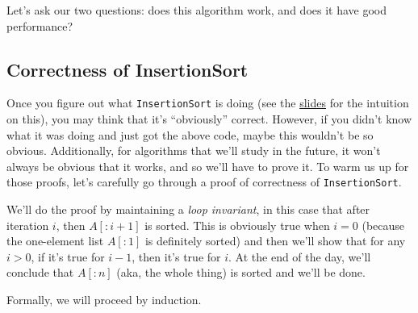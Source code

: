 \documentclass [12pt]{article}
\begin{document}
Let's ask our two questions: does this algorithm work, and does it have good performance?

\subsection{Correctness of InsertionSort}

Once you figure out what \texttt{InsertionSort} is doing (see the \href{https://docs.google.com/presentation/d/1dyxQVgRnZX1C1UMkoxdPFQbItSSKCWpScSNs0tl_pkI/edit?usp=sharing}{slides} for the intuition on this), you may think that it’s ``obviously'' correct. However, if you didn’t know what it was doing and just got the above code, maybe this wouldn’t be so obvious. Additionally, for algorithms that we’ll study in the future, it won’t always be obvious that it works, and so we’ll have to prove it. To warm us up for those proofs, let’s carefully go through a proof of correctness of \texttt{InsertionSort}.

We’ll do the proof by maintaining a \textit{loop invariant}, in this case that after iteration $i$, then $A[:i+1]$ is sorted. This is obviously true when $i=0$ (because the one-element list $A[: 1]$ is definitely sorted) and then we’ll show that for any $i > 0$, if it’s true for $i - 1$, then it’s true for $i$. At the end of the day, we’ll conclude that $A[:n]$ (aka, the whole thing) is sorted and we’ll be done.

Formally, we will proceed by induction.
\end{document}

